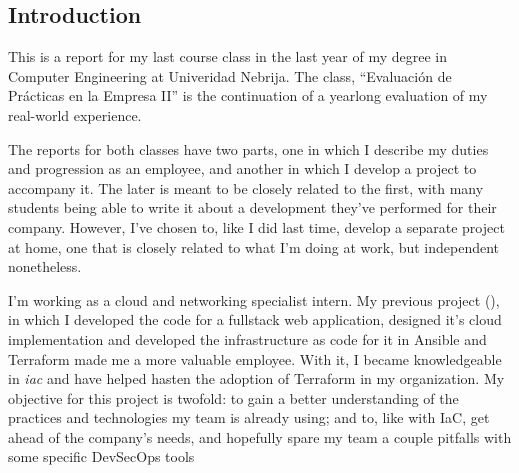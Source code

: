 \documentclass[11pt]{article}
\begin{document}
\clearpage
\printnoidxglossary[type=\acronymtype, sort=standard, style=mcolindex ]

\clearpage
\setlength{\glsdescwidth}{.7\linewidth}
\printnoidxglossary[sort=standard, style=long3col ]




\renewcommand{\labelenumii}{\arabic{enumi}.\arabic{enumii}} %


\begin{flushleft}


















\clearpage
\section{Introduction}
This is a report for my last course class in the last year of my degree in Computer Engineering at Univeridad Nebrija. The class, ``Evaluación de Prácticas en la Empresa II'' is the continuation of a yearlong evaluation of my real-world experience. 
\linebreak

The reports for both classes have two parts, one in which I describe my duties and progression as an employee, and another in which I develop a project to accompany it. The later is meant to be closely related to the first, with many students being able to write it about a development they've performed for their company. However, I've chosen to, like I did last time, develop a separate project at home, one that is closely related to what I'm doing at work, but independent nonetheless. 
\linebreak

I'm working as a cloud and networking specialist intern. My previous project (\cite{misgit1}), in which I developed the code for a fullstack web application, designed it's cloud implementation and developed the infrastructure as code for it in Ansible and Terraform made me a more valuable employee. With it, I became knowledgeable in \textit{\acrshort{iac}} and have helped hasten the adoption of Terraform in my organization. My objective for this project is twofold: to gain a better understanding of the practices and technologies my team is already using; and to, like with IaC, get ahead of the company's needs, and hopefully spare my team a couple pitfalls with some specific DevSecOps tools
\linebreak


\end{flushleft}
\end{document}
